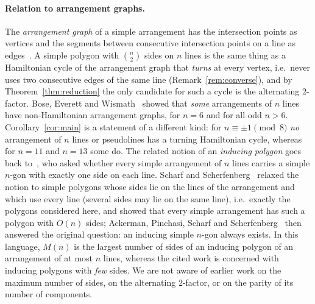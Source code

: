 \paragraph{Relation to arrangement graphs.} The \emph{arrangement graph} of a simple arrangement has
the intersection points as vertices and the segments between consecutive intersection points on a
line as edges~\cite{BoseEverettWismath2003,FelsnerHurtadoNoyStreinu2006}. A simple polygon with
$\binom n2$ sides on $n$ lines is the same thing as a Hamiltonian cycle of the arrangement graph that
\emph{turns} at every vertex, i.e.\ never uses two consecutive edges of the same line
(Remark~\ref{rem:converse}), and by Theorem~\ref{thm:reduction} the only candidate for such a cycle is
the alternating $2$-factor. Bose, Everett and Wismath~\cite{BoseEverettWismath2003} showed that
\emph{some} arrangements of $n$ lines have non-Hamiltonian arrangement graphs, for $n=6$ and for all odd
$n>6$. Corollary~\ref{cor:main} is a statement of a different kind: for $n\equiv\pm1\pmod 8$ \emph{no}
arrangement of $n$ lines or pseudolines has a turning Hamiltonian cycle, whereas for $n=11$ and $n=13$
some do. The related notion of an \emph{inducing polygon} goes back to~\cite{BoseEverettWismath2003}, who
asked whether every simple arrangement of $n$ lines carries a simple $n$-gon with exactly one side on
each line. Scharf and Scherfenberg~\cite{ScharfScherfenberg2011} relaxed the notion to simple polygons
whose sides lie on the lines of the arrangement and which use every line (several sides may lie on the
same line), i.e.\ exactly the polygons considered here, and showed that every simple arrangement has
such a polygon with $O(n)$ sides; Ackerman, Pinchasi, Scharf and
Scherfenberg~\cite{AckermanPinchasiScharfScherfenberg2013} then answered the original question: an
inducing simple $n$-gon always exists. In this language, $M(n)$ is the largest number of sides of an
inducing polygon of an arrangement of at most $n$ lines, whereas the cited work is concerned with
inducing polygons with \emph{few} sides. We are not aware of earlier work on the maximum number of
sides, on the alternating $2$-factor, or on the parity of its number of components.


